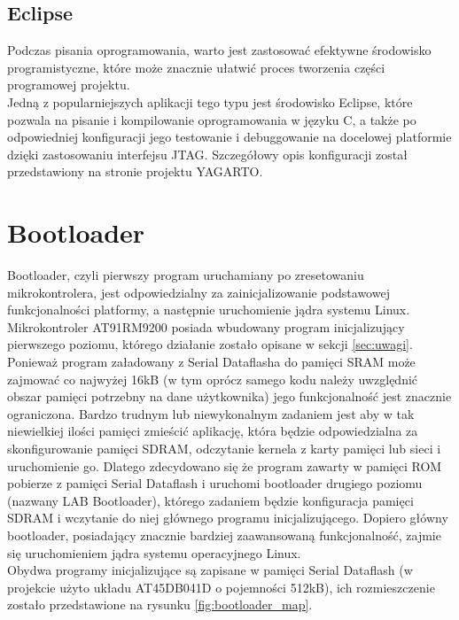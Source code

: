 \documentclass[a4paper,12pt]{book}
\begin{document}
			\subsection{Eclipse}
				Podczas pisania oprogramowania, warto jest zastosować efektywne środowisko programistyczne, które może znacznie ułatwić proces tworzenia części programowej projektu.\\
				Jedną z popularniejszych aplikacji tego typu jest środowisko Eclipse, które pozwala na pisanie i kompilowanie oprogramowania w języku C, a także po odpowiedniej konfiguracji jego testowanie i debuggowanie na docelowej platformie dzięki zastosowaniu interfejsu JTAG. Szczegółowy opis konfiguracji został przedstawiony na stronie projektu YAGARTO\cite{website:yagarto}.
				
		\section{Bootloader}
			Bootloader, czyli pierwszy program uruchamiany po zresetowaniu mikrokontrolera, jest odpowiedzialny za zainicjalizowanie podstawowej funkcjonalności platformy, a następnie uruchomienie jądra systemu Linux. Mikrokontroler AT91RM9200 posiada wbudowany program inicjalizujący pierwszego poziomu, którego działanie zostało opisane w sekcji \ref{sec:uwagi}.\\
			Ponieważ program załadowany z Serial Dataflasha do pamięci SRAM może zajmować co najwyżej 16kB (w tym oprócz samego kodu należy uwzględnić obszar pamięci potrzebny na dane użytkownika) jego funkcjonalność jest znacznie ograniczona. Bardzo trudnym lub niewykonalnym zadaniem jest aby w tak niewielkiej ilości pamięci zmieścić aplikację, która będzie odpowiedzialna za skonfigurowanie pamięci SDRAM, odczytanie kernela z karty pamięci lub sieci i uruchomienie go. Dlatego zdecydowano się że program zawarty w pamięci ROM pobierze z pamięci Serial Dataflash i uruchomi bootloader drugiego poziomu (nazwany LAB Bootloader), którego zadaniem będzie konfiguracja pamięci SDRAM i wczytanie do niej głównego programu inicjalizującego. Dopiero główny bootloader, posiadający znacznie bardziej zaawansowaną funkcjonalność, zajmie się uruchomieniem jądra systemu operacyjnego Linux.\\
			Obydwa programy inicjalizujące są zapisane w pamięci Serial Dataflash (w projekcie użyto układu AT45DB041D o pojemności 512kB), ich rozmieszczenie zostało przedstawione na rysunku \ref{fig:bootloader_map}.
\end{document}

